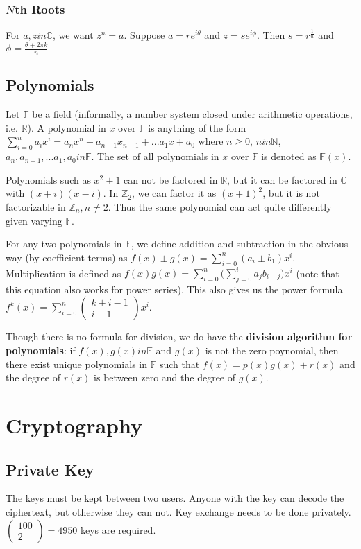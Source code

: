 \documentclass[12pt]{article}
\begin{document}
\subsubsection*{$N$th Roots}
For $a,z in \mathbb{C}$, we want $z^n = a$. Suppose $a = re^{i\theta}$ and $z = se^{i\phi}$. Then $s = r^\frac{1}{n}$ and $\phi = \frac{\theta + 2\pi k}{n}$

\subsection*{Polynomials}
 Let $\mathbb{F}$ be a field (informally, a number system closed under arithmetic operations, i.e. $\mathbb{R}$). A polynomial in $x$ over $\mathbb{F}$ is anything of the form $\displaystyle\sum_{i = 0}^n a_ix^i = a_nx^n + a_{n-1}x_{n-1} + ... a_1x + a_0$ where $n \geq 0$, $n in \mathbb{N}$, $a_n, a_{n-1}, ... a_1, a_0 in \mathbb{F}$. The set of all polynomials in $x$ over $\mathbb{F}$ is denoted as $\mathbb{F}(x)$.

Polynomials such as $x^2 + 1$ can not be factored in $\mathbb{R}$, but it can be factored in $\mathbb{C}$ with $(x + i)(x - i)$. In $\mathbb{Z}_2$, we can factor it as $(x + 1)^2$, but it is not factorizable in $\mathbb{Z}_n, n \neq 2$. Thus the same polynomial can act quite differently given varying $\mathbb{F}$.

For any two polynomials in $\mathbb{F}$, we define addition and subtraction in the obvious way (by coefficient terms) as $f(x) \pm g(x) = \displaystyle\sum_{i = 0}^n (a_i \pm b_1) x^i$. Multiplication is defined as $f(x)g(x) = \displaystyle\sum_{i = 0}^n \bigg( \sum_{j = 0}^i a_j b_{i-j} \bigg) x^i$ (note that this equation also works for power series). This also gives us the power formula $f^k(x) = \displaystyle\sum_{i = 0}^n \begin{pmatrix}k + i - 1 \\ i - 1\end{pmatrix} x^i$.

Though there is no formula for division, we do have the {\bf division algorithm for polynomials}: if $f(x), g(x) in \mathbb{F}$ and $g(x)$ is not the zero poynomial, then there exist unique polynomials in $\mathbb{F}$ such that $f(x) = p(x)g(x) + r(x)$ and the degree of $r(x)$ is between zero and the degree of $g(x)$.

\section*{Cryptography}
\subsection*{Private Key}
The keys must be kept between two users. Anyone with the key can decode the ciphertext, but otherwise they can not. Key exchange needs to be done privately. $\begin{pmatrix}100 \\ 2\end{pmatrix} = 4950$ keys are required.
\end{document}
